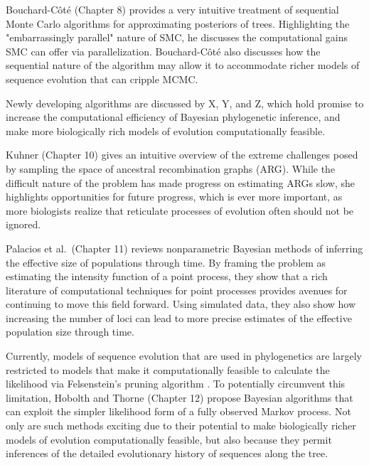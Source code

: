 \documentclass[letterpaper,12pt]{article}
\begin{document}
Bouchard-C\^{o}t\'{e} (Chapter 8) provides a very intuitive treatment of
sequential Monte Carlo algorithms for approximating posteriors of trees.
Highlighting the "embarrassingly parallel" nature of SMC, he discusses
the computational gains SMC can offer via parallelization.
Bouchard-C\^{o}t\'{e} also discusses how the sequential nature of the
algorithm may allow it to accommodate richer models of sequence evolution
that can cripple MCMC.

Newly developing algorithms are discussed by X, Y, and Z,
which hold promise to increase the computational efficiency of Bayesian
phylogenetic inference, and make more biologically rich models of evolution
computationally feasible.

Kuhner (Chapter 10) gives an intuitive overview of the extreme challenges
posed by sampling the space of ancestral recombination graphs (ARG).
While the difficult nature of the problem has made progress on estimating
ARGs slow, she highlights opportunities for future progress, which is ever more
important, as more biologists realize that reticulate processes of evolution
often should not be ignored.

Palacios et al.\ (Chapter 11) reviews nonparametric Bayesian methods of
inferring the effective size of populations through time. By framing
the problem as estimating the intensity function of a point process,
they show that a rich literature of computational techniques
for point processes provides avenues for continuing to move
this field forward.
Using simulated data, they also show how increasing the number
of loci can lead to more precise estimates of the effective
population size through time.

Currently, models of sequence evolution that are used in phylogenetics are
largely restricted to models that make it computationally feasible to calculate
the likelihood via Felsenstein's pruning algorithm \citep{Felsenstein1981}.
To potentially circumvent this limitation, Hobolth and Thorne (Chapter 12)
propose Bayesian algorithms that can exploit the simpler likelihood form
of a fully observed Markov process.
Not only are such methods exciting due to their potential to make biologically
richer models of evolution computationally feasible, 
but also because they permit inferences of the detailed evolutionary history
of sequences along the tree.
\end{document}
